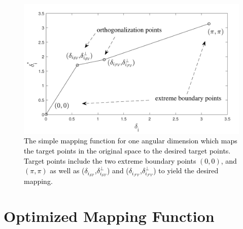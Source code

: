 \begin{figure}[t]
\centering
\includegraphics[scale=0.7]{Fig/simple_spline2.pdf}
\caption{\textcolor{black}{The simple mapping function for one angular dimension which maps the target points in the original space to the desired target points. Target points include the two extreme boundary points $(0,0)$, and $(\pi,\pi)$ as well as ($\delta_{i_{{\mathcal{SV}}}}$,$\delta^{\perp}_{i_{{\mathcal{SV}}}}$) and ($\delta_{i_{{\mathcal{FV}}}}$,$\delta^{\perp}_{i_{{\mathcal{FV}}}}$) to yield the desired mapping.} }%
\label{fig:simple_spline}
\end{figure}

\section{Optimized Mapping Function}

